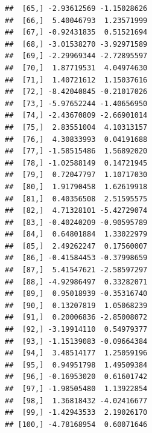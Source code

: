 \documentclass[
]{article}
\newenvironment{Shaded}{\begin{snugshade}}{\end{snugshade}}
\newcommand{\ControlFlowTok}[1]{\textcolor[rgb]{0.13,0.29,0.53}{\textbf{#1}}}
\newcommand{\DecValTok}[1]{\textcolor[rgb]{0.00,0.00,0.81}{#1}}
\newcommand{\FunctionTok}[1]{\textcolor[rgb]{0.00,0.00,0.00}{#1}}
\newcommand{\NormalTok}[1]{#1}
\newcommand{\OtherTok}[1]{\textcolor[rgb]{0.56,0.35,0.01}{#1}}
\newcommand{\SpecialCharTok}[1]{\textcolor[rgb]{0.00,0.00,0.00}{#1}}
\newcommand{\StringTok}[1]{\textcolor[rgb]{0.31,0.60,0.02}{#1}}
\begin{document}
\begin{verbatim}
##  [65,] -2.93612569 -1.15028626
##  [66,]  5.40046793  1.23571999
##  [67,] -0.92431835  0.51521694
##  [68,] -3.01538270 -3.92971589
##  [69,] -2.29969344 -2.72895597
##  [70,]  1.87719531  4.04974630
##  [71,]  1.40721612  1.15037616
##  [72,] -8.42040845 -0.21017026
##  [73,] -5.97652244 -1.40656950
##  [74,] -2.43670809 -2.66901014
##  [75,]  2.83551004  4.10313157
##  [76,]  4.30833993  0.04191688
##  [77,] -1.58515486  1.56892020
##  [78,] -1.02588149  0.14721945
##  [79,]  0.72047797  1.10717030
##  [80,]  1.91790458  1.62619918
##  [81,]  0.40356508  2.51595575
##  [82,]  4.71328101 -5.42729074
##  [83,] -0.40240209 -0.90595789
##  [84,]  0.64801884  1.33022979
##  [85,]  2.49262247  0.17560007
##  [86,] -0.41584453 -0.37998659
##  [87,]  5.41547621 -2.58597297
##  [88,] -4.92986497  0.33282071
##  [89,]  0.95018939 -0.35316740
##  [90,]  0.13207819  1.05068239
##  [91,]  0.20006836 -2.85008072
##  [92,] -3.19914110  0.54979377
##  [93,] -1.15139083 -0.09664384
##  [94,]  3.48514177  1.25059196
##  [95,]  0.94951798  1.49509384
##  [96,] -0.16953020  0.61601742
##  [97,] -1.98505480  1.13922854
##  [98,]  1.36818432 -4.02416677
##  [99,] -1.42943533  2.19026170
## [100,] -4.78168954  0.60071646
\end{verbatim}

\begin{Shaded}
\end{Shaded}
\end{document}
